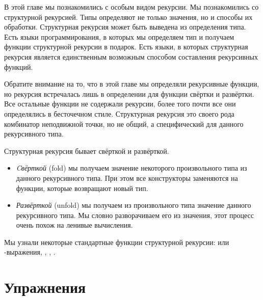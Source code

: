 В этой главе мы познакомились с особым видом рекурсии. 
Мы познакомились со структурной рекурсией. Типы определяют
не только значения, но и способы их обработки. Структурная
рекурсия может быть выведена из определения типа. 
Есть языки программирования, в которых мы определяем тип 
и получаем функции структурной рекурсии в подарок. 
Есть языки, в которых структурная рекурсия является единственным
возможным способом составления рекурсивных функций. 

Обратите внимание на то, что в этой главе мы определяли
рекурсивные функции, но рекурсия встречалась лишь 
в определении для функции свёртки и развёртки. 
Все остальные функции не содержали рекурсии, более того
почти все они определялись в бесточечном стиле.
Структурная рекурсия это своего рода комбинатор 
неподвижной точки, но не общий, а специфический для
данного рекурсивного типа.

Структурная рекурсия бывает свёрткой и развёрткой. 

\begin{itemize}

\item \emph{Cвёрткой} (fold) мы получаем значение некоторого 
произвольного типа из данного рекурсивного типа. 
При этом все конструкторы заменяются на функции, 
которые возвращают новый тип. 

\item \emph{Развёрткой} (unfold) мы получаем из произвольного типа
значение данного рекурсивного типа. Мы словно разворачиваем 
его из значения, этот процесс очень похож на ленивые
вычисления. 

\end{itemize}

Мы узнали некоторые стандартные функции структурной
рекурсии:  или -выражения, ,
, .

\section{Упражнения}


